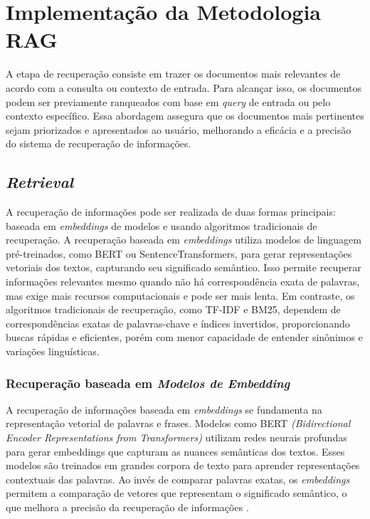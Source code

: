 \newpage
\section{Implementação da Metodologia RAG}

A etapa de recuperação consiste em trazer os documentos mais relevantes de acordo com a consulta ou contexto de entrada. Para alcançar isso, os documentos podem ser previamente ranqueados com base em \textit{query} de entrada ou pelo contexto específico. Essa abordagem assegura que os documentos mais pertinentes sejam priorizados e apresentados ao usuário, melhorando a eficácia e a precisão do sistema de recuperação de informações.

\subsection{\textit{Retrieval}}

A recuperação de informações pode ser realizada de duas formas principais: baseada em \textit{embeddings} de modelos e usando algoritmos tradicionais de recuperação. A recuperação baseada em \textit{embeddings} utiliza modelos de linguagem pré-treinados, como BERT ou SentenceTransformers, para gerar representações vetoriais dos textos, capturando seu significado semântico. Isso permite recuperar informações relevantes mesmo quando não há correspondência exata de palavras, mas exige mais recursos computacionais e pode ser mais lenta. Em contraste, os algoritmos tradicionais de recuperação, como TF-IDF e BM25, dependem de correspondências exatas de palavras-chave e índices invertidos, proporcionando buscas rápidas e eficientes, porém com menor capacidade de entender sinônimos e variações linguísticas. 

\subsubsection {Recuperação baseada em \textit{Modelos de Embedding}}

A recuperação de informações baseada em \textit{embeddings} se fundamenta na representação vetorial de palavras e frases. Modelos como BERT \textit{(\textit{Bidirectional Encoder Representations from Transformers})} \cite{DBLP:journals/corr/abs-1810-04805} utilizam redes neurais profundas para gerar embeddings que capturam as nuances semânticas dos textos. Esses modelos são treinados em grandes corpora de texto para aprender representações contextuais das palavras. Ao invés de comparar palavras exatas, os \textit{embeddings} permitem a comparação de vetores que representam o significado semântico, o que melhora a precisão da recuperação de informações \cite{alaparthi2020bidirectionalencoderrepresentationstransformers}. 

